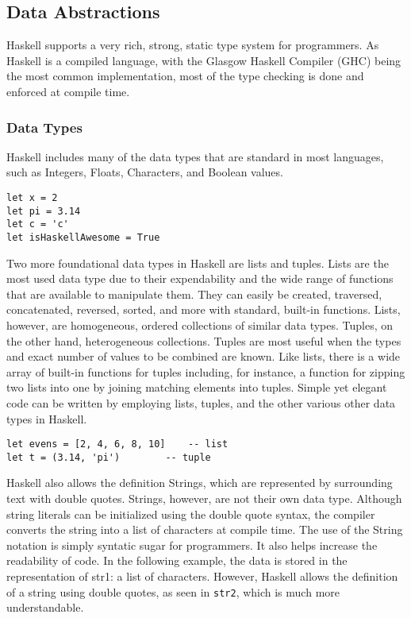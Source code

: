 \documentclass[titlepage,12pt]{article}
\begin{document}
\subsection{Data Abstractions}
Haskell supports a very rich, strong, static type system for programmers.  As Haskell is
a compiled language, with the Glasgow Haskell Compiler (GHC) being the most common implementation,
most of the type checking is done and enforced at compile time.

\subsubsection{Data Types}

Haskell includes many of the data types that are standard in most languages, such as Integers, Floats, Characters, and Boolean values. 

\begin{verbatim}
let x = 2
let pi = 3.14
let c = 'c'
let isHaskellAwesome = True
\end{verbatim}

Two more foundational data types in Haskell are lists and tuples. Lists are the most used data type due to their expendability 
and the wide range of functions that are available to manipulate them. They can easily be created, traversed, concatenated, 
reversed, sorted, and more with standard, built-in functions. Lists, however, are homogeneous, ordered collections of
similar data types. Tuples, on the other hand, heterogeneous collections. Tuples are most useful when the types and exact number of 
values to be combined are known. Like lists, there is a wide array of built-in functions for tuples including, for instance,
a function for zipping two lists into one by joining matching elements into tuples. Simple yet elegant code can be written by
employing lists, tuples, and the other various other data types in Haskell.

\begin{verbatim}
let evens = [2, 4, 6, 8, 10]	-- list
let t = (3.14, 'pi')		-- tuple
\end{verbatim}

Haskell also allows the definition Strings, which are represented by surrounding text with double quotes. Strings, however, 
are not their own data type. Although string literals can be initialized using the double quote syntax, the compiler converts the 
string into a list of characters at compile time. The use of the String notation is simply syntatic sugar for programmers. 
It also helps increase the readability of code. In the following example, the data is stored in the representation of 
str1: a list of characters. However, Haskell allows the definition of a string using double quotes, as seen in \texttt{str2}, 
which is much more understandable.
\end{document}
